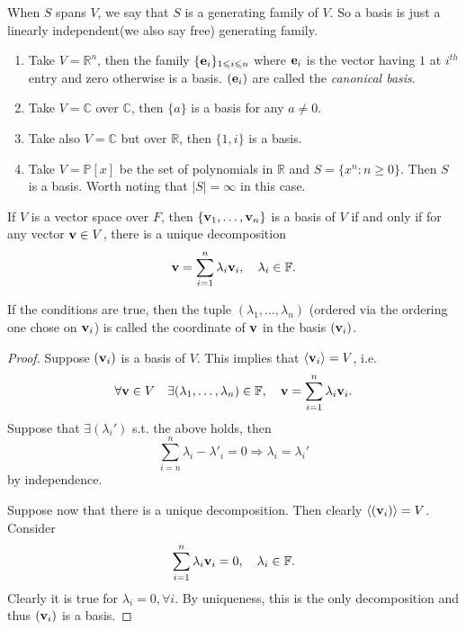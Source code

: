 \documentclass[a4paper]{article}
\begin{document}
\begin{remark}
    When $S$ spans $V$, we say that $S$ is a generating family of $V$.
    So a basis is just a linearly independent(we also say free) generating family.
\end{remark}
\begin{example}
    \begin{enumerate}
        \item Take $V=\mathbb R^n$, then the family $\{{\bf e}_i\}_{1\leqslant i\leqslant n}$ where ${\bf e}_i$ is the vector having $1$ at $i^{th}$ entry and zero otherwise is a basis. $ ({\bf e}_i) $ are called the \textit{canonical basis}.
        \item Take $V=\mathbb C$ over $\mathbb C$, then $\{a\}$ is a basis for any $a\neq 0$.
        \item Take also $V=\mathbb C$ but over $\mathbb R$, then $\{1,i\}$ is a basis.
        \item Take $V=\mathbb P[x]$ be the set of polynomials in $\mathbb R$ and $S=\{x^n:n\ge 0\}$.
        Then $S$ is a basis.
        Worth noting that $|S|=\infty$ in this case.
    \end{enumerate}
\end{example}
\begin{lemma}
    If $V$ is a vector space over $F$, then $\{{\bf v}_1,\ldots,{\bf v}_n\}$ is a basis of $V$ if and only if for any vector ${\bf v}\in V$, there is a unique decomposition
    $${\bf v}=\sum_{i=1}^n\lambda_i{\bf v}_i,\quad \lambda_i\in \mathbb{F}.$$
\end{lemma}
\begin{remark}
    If the conditions are true, then the tuple $(\lambda_1,\ldots,\lambda_n)$ (ordered via the ordering one chose on ${\bf v}_i$) is called the coordinate of ${\bf v}$ in the basis $({\bf v}_i)$.
\end{remark}
\begin{proof}
    Suppose $ ({\bf v}_i) $ is a basis of $V$. This implies that $ \langle {\bf v}_i \rangle =V $, i.e. 
    \[
        \forall {\bf v}\in V\quad \exists (\lambda_1,\dots,\lambda_n)\in {\mathbb{F}},\quad {\bf v} = \sum_{i=1}^{n}\lambda_i{\bf v}_i.
    \]
    Suppose that $ \exists (\lambda_i') $ s.t. the above holds, then 
    \[
        \sum_{i=n}^{n} \lambda_i-\lambda'_i=0 \Longrightarrow \lambda_i=\lambda_i'
    \]
    by independence.

    Suppose now that there is a unique decomposition. Then clearly $ \langle ({\bf v}_i) \rangle =V $. Consider 
    \[
        \sum_{i=1}^n\lambda_i{\bf v}_i=0,\quad \lambda_i\in \mathbb{F}.
    \]
    Clearly it is true for $ \lambda_i=0,\forall i $. By uniqueness, this is the only decomposition and thus $ ({\bf v}_i) $ is a basis.
\end{proof}
\end{document}
